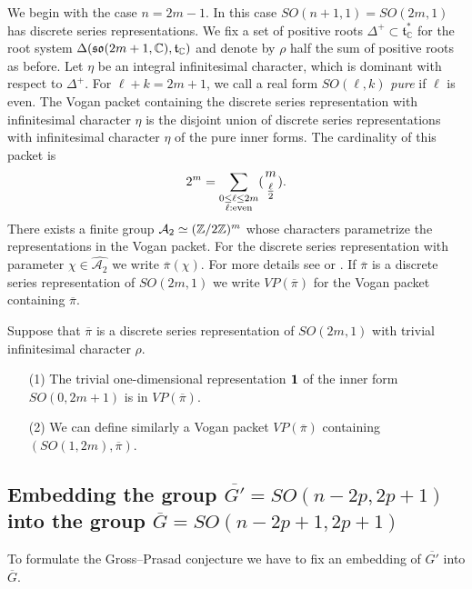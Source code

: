 We begin with the case
 $n=2m-1$.  
In this case $SO(n+1,1)=SO(2m,1)$
 has discrete series representations.  
We fix a set of positive roots 
$
   \Delta^+ \subset {\mathfrak{t}}_{\mathbb{C}}^{\ast}
$
 for the root system 
 $\Delta({\mathfrak{so}}(2m+1,{\mathbb C}),{\mathfrak{t}}_{\mathbb{C}})$
 and denote by $\rho$ half the sum of positive roots as before. 
Let $\eta $ be an integral infinitesimal character, 
 which is dominant with respect to  $\Delta  ^+$.
For $\ell+k=2m+1$, 
 we call a real form $SO(\ell,k)$ {\it{pure}}
 if $\ell$ is even.
The Vogan packet containing the discrete series representation with infinitesimal character $\eta$ is the disjoint union of discrete series representations with infinitesimal character $\eta$ of the pure inner forms. 
The cardinality of this packet is 
\[
   2^m=\sum_{\substack{0 \le \ell \le 2m \\ \ell:\text{even}}} 
({m \atop{\frac \ell 2}}).  
\]
There exists a finite group 
$
  {\mathcal  A}_2 \simeq ({\mathbb Z}/2{\mathbb Z})^m$  whose characters parametrize the representations in the Vogan packet. For the discrete series representation with parameter $\chi \in \widehat{{\mathcal{A}}_2}$
 we write $\overline{\pi}(\chi). $ For more details
 see \cite{GP} or \cite{V}. 
If $\overline{\pi}$ is a discrete series representation of $SO(2m,1)$ we write $VP(\overline{\pi})$ for the Vogan packet containing $\overline{\pi}$.
  

\begin{example}
Suppose that $\overline{\pi }$ is a discrete series representation
 of $SO(2m,1)$
 with trivial infinitesimal character $\rho$. 
{\rm{
\begin{itemize}
\item[{\rm{(1)}}] The trivial one-dimensional representation ${\bf{1}}$
 of the inner form $SO(0,2m+1)$ is in $VP(\overline{\pi })$.

\item[{\rm{(2)}}] We can define similarly a Vogan packet $VP(\overline{\pi })$ containing $(SO(1,2m),\overline{\pi })$.  
\end{itemize}
}}
\end{example}

\subsection{Embedding the group 
$\overline{G'}=SO(n-2p,2p+1)$ into the group 
 $\overline{G}=SO(n-2p+1,2p+1)$} 

To formulate the Gross--Prasad conjecture
 we have to fix an embedding of $\overline{G'}$ into $\overline{G}$. 

